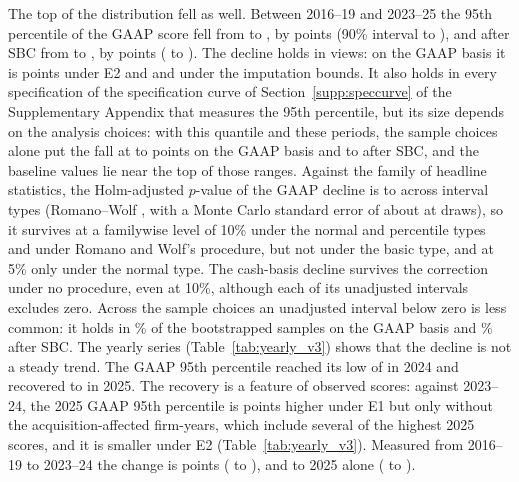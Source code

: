 The top of the distribution fell as well. Between 2016--19 and 2023--25 the 95th percentile of the GAAP score fell from \TopEarlyOp{} to \TopLateOp, by \TopFallOpEone{} points (90\% interval \TopFallOpEoneLo{} to \TopFallOpEoneHi), and after SBC from \TopEarlyCash{} to \TopLateCash, by \TopFallCashEone{} points (\TopFallCashEoneLo{} to \TopFallCashEoneHi). The decline holds in \TopCount{} views: on the GAAP basis it is \TopFallOpEtwo{} points under E2 and \TopFallOpImpFour{} and \TopFallOpImpEight{} under the imputation bounds. It also holds in every specification of the specification curve of Section~\ref{supp:speccurve} of the Supplementary Appendix that measures the 95th percentile, but its size depends on the analysis choices: with this quantile and these periods, the sample choices alone put the fall at \ScTopOpCoreFallLo{} to \ScTopOpCoreFallHi{} points on the GAAP basis and \ScTopCashCoreFallLo{} to \ScTopCashCoreFallHi{} after SBC, and the baseline values lie near the top of those ranges. Against the family of headline statistics, the Holm-adjusted $p$-value of the GAAP decline is \HolmTopLo{} to \HolmTopHi{} across interval types (Romano--Wolf \HolmTopRW, with a Monte Carlo standard error of about \HolmTopRWSe{} at \BootB{} draws), so it survives at a familywise level of 10\% under the normal and percentile types and under Romano and Wolf's procedure, but not under the basic type, and at 5\% only under the normal type. The cash-basis decline survives the correction under no procedure, even at 10\%, although each of its unadjusted intervals excludes zero. Across the sample choices an unadjusted interval below zero is less common: it holds in \ScTopOpBootCoreShare\% of the bootstrapped samples on the GAAP basis and \ScTopCashBootCoreShare\% after SBC. The yearly series (Table~\ref{tab:yearly_v3}) shows that the decline is not a steady trend. The GAAP 95th percentile reached its low of \TopYearMinOp{} in 2024 and recovered to \TopYearLastOp{} in 2025. The recovery is a feature of observed scores: against 2023--24, the 2025 GAAP 95th percentile is \RecoveryEone{} points higher under E1 but only \RecoveryNoAcq{} without the acquisition-affected firm-years, which include several of the highest 2025 scores, and it is smaller under E2 (Table~\ref{tab:yearly_v3}). Measured from 2016--19 to 2023--24 the change is \TopTwentyFourOp{} points (\TopTwentyFourOpLo{} to \TopTwentyFourOpHi), and to 2025 alone \TopTwentyFiveOp{} (\TopTwentyFiveOpLo{} to \TopTwentyFiveOpHi).

